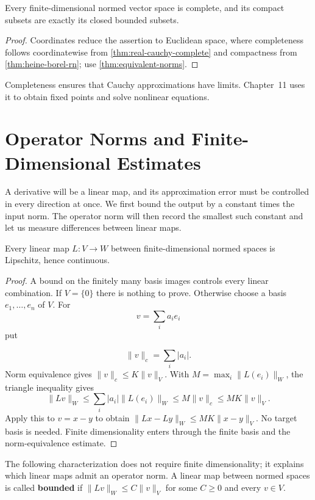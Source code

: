 
\begin{corollary}
\label{cor:finite-dimensional-completeness}
Every finite-dimensional normed vector space is complete, and its compact
subsets are exactly its closed bounded subsets.
\end{corollary}
\begin{proof}
Coordinates reduce the assertion to Euclidean space, where completeness
follows coordinatewise from \cref{thm:real-cauchy-complete} and compactness
from \cref{thm:heine-borel-rn}; use \cref{thm:equivalent-norms}.
\end{proof}

Completeness ensures that Cauchy approximations have limits. Chapter~11
uses it to obtain fixed points and solve nonlinear equations.

\section{Operator Norms and Finite-Dimensional Estimates}

A derivative will be a linear map, and its approximation error must be
controlled in every direction at once. We first bound the output by a
constant times the input norm. The operator norm will then record the
smallest such constant and let us measure differences between linear maps.

\begin{proposition}
\label{prop:linear-continuity}
Every linear map $L:V\to W$ between finite-dimensional normed spaces is Lipschitz, hence continuous.
\end{proposition}
\begin{proof}
A bound on the finitely many basis images controls every linear combination.
If $V=\{0\}$ there is nothing to prove. Otherwise choose a basis
$e_1,\ldots,e_n$ of $V$. For
\[
v=\sum_i a_i e_i
\]
 put

\[
\|v\|_c=\sum_i|a_i|.
\]
 Norm equivalence gives $\|v\|_c\leq K\|v\|_V$.
With $M=\max_i\|L(e_i)\|_W$, the triangle inequality gives
\[
\|Lv\|_W\leq\sum_i|a_i|\|L(e_i)\|_W
\leq M\|v\|_c\leq MK\|v\|_V.
\]
Apply this to $v=x-y$ to obtain $\|Lx-Ly\|_W\leq MK\|x-y\|_V$.
No target basis is needed. Finite dimensionality enters through the finite
basis and the norm-equivalence estimate.
\end{proof}
The following characterization does not require finite dimensionality; it
explains which linear maps admit an operator norm. A linear map between
normed spaces is called \textbf{bounded} if
$\|Lv\|_W\leq C\|v\|_V$ for some $C\geq0$ and every $v\in V$.


